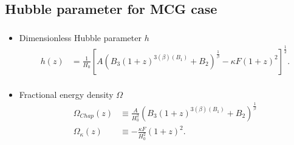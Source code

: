 \documentclass{beamer}
\newcommand{\brac}[1]{\left(#1\right)}
\newcommand{\bracc}[1]{\left[#1\right]}
\begin{document}
\subsection{Hubble parameter for MCG case}
\begin{frame}
\frametitle{\insertsectionhead}
\framesubtitle{\insertsubsectionhead}
\fontsize{8pt}{7.2}\selectfont
\begin{itemize}
\item Dimensionless Hubble parameter $h$
\begin{equation}\label{eq:zChDimHubbleParm}
\begin{split}
h(z) &= \frac{1}{H_{0}}\bracc{A\brac{B_{3}\brac{1+z}^{3\brac{\beta}\brac{B_{1}}}+B_{2}}^{\frac{1}{\beta}} -\kappa F\brac{1+z}^{2}}^{\frac{1}{2}}.\\
\end{split}
\end{equation}
\item Fractional energy density $\Omega$
\begin{equation}\label{eq:ChFracEnDen}
\begin{split}
\Omega_{Chap}(z) &\equiv \frac{A}{H_{0}^{2}}\brac{B_{3}\brac{1+z}^{3\brac{\beta}\brac{B_{1}}}+B_{2}}^{\frac{1}{\beta}} \\
\Omega_{\kappa}(z)&\equiv -\frac{\kappa F}{H_{0}^{2}}\brac{1+z}^{2}.\\
\end{split}
\end{equation}
\end{itemize}


\end{frame}
\end{document}
